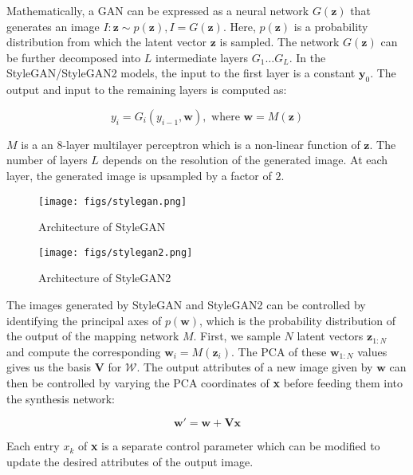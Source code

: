 Mathematically, a GAN can be expressed as a neural network $G(\textbf{z})$ that generates an image $I: \textbf{z} \sim p(\textbf{z}), I = G(\textbf{z})$. Here, $p(\textbf{z})$ is a probability distribution from which the latent vector $\textbf{z}$ is sampled. The network $G(\textbf{z})$ can be further decomposed into $L$ intermediate layers $G_1\ldots G_L$. In the StyleGAN/StyleGAN2 models, the input to the first layer is a constant $\textbf{y}_0$. The output and input to the remaining layers is computed as:

\begin{equation}
  y_i = G_i(y_{i-1}, \mathbf{w}),\text{ where }\mathbf{w} = M(\mathbf{z})
\end{equation}

$M$ is a an $8$-layer multilayer perceptron which is a non-linear function of $\textbf{z}$. The number of layers $L$ depends on the resolution of the generated image. At each layer, the generated image is upsampled by a factor of $2$.

\begin{figure}[H]
  \centering
  \texttt{[image: figs/stylegan.png]}
  \caption{Architecture of StyleGAN\cite{stylegan}}
  \label{fig:stylegan}
\end{figure}

\begin{figure}[H]
  \centering
  \texttt{[image: figs/stylegan2.png]}
  \caption{Architecture of StyleGAN2\cite{stylegan2}}
  \label{fig:stylegan2}
\end{figure}

The images generated by StyleGAN and StyleGAN2 can be controlled by identifying the principal axes of $p(\textbf{w})$, which is the probability distribution of the output of the mapping network $M$. First, we sample $N$ latent vectors $\textbf{z}_{1:N}$ and compute the corresponding $\textbf{w}_{i} = M(\textbf{z}_{i})$. The PCA of these $\textbf{w}_{1:N}$ values gives us the basis $\textbf{V}$ for $\mathcal{W}$. The output attributes of a new image given by $\textbf{w}$ can then be controlled by varying the PCA coordinates of \textbf{x} before feeding them into the synthesis network:

\begin{equation}
    \mathbf{w'} = \mathbf{w} + \mathbf{Vx}
\end{equation}

Each entry $x_{k}$ of \textbf{x} is a separate control parameter which can be modified to update the desired attributes of the output image.

